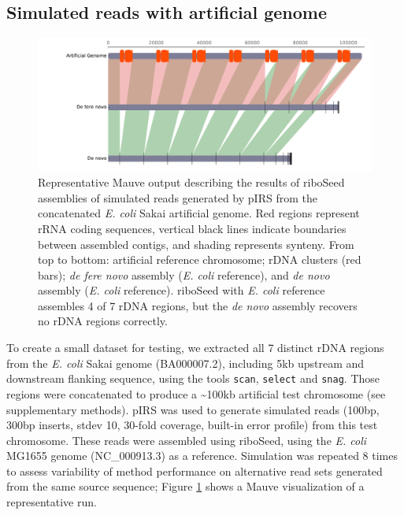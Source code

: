 \documentclass[a4,center,fleqn]{NAR}
\begin{document}
\subsection*{Simulated reads with artificial genome}


\begin{figure}[!b]
    \centering
    \hspace*{-.7cm}\includegraphics[width=1.2\columnwidth]{PrettyMauve}
    \caption{Representative Mauve output describing the results of riboSeed assemblies of simulated reads generated by pIRS from the concatenated \textit{E. coli} Sakai artificial genome. Red regions represent rRNA coding sequences, vertical black lines indicate boundaries between assembled contigs, and shading represents synteny. From top to bottom: artificial reference chromosome; rDNA clusters (red bars); \textit{de fere novo} assembly (\textit{E. coli} reference), and \textit{de novo} assembly (\textit{E. coli} reference). riboSeed with \textit{E. coli} reference assembles 4 of 7 rDNA regions, but the \textit{de novo} assembly recovers no rDNA regions correctly.
}
\label{fig:artificial}
\end{figure}


To create a small dataset for testing, we extracted all 7 distinct rDNA regions from the \textit{E. coli} Sakai genome (BA000007.2), including 5kb upstream and downstream flanking sequence, using the tools \texttt{scan}, \texttt{select} and \texttt{snag}. Those regions were concatenated to produce a \textasciitilde100kb artificial test chromosome (see supplementary methods). pIRS \cite{Hu2012} was used to generate simulated reads (100bp, 300bp inserts, stdev 10, 30-fold coverage, built-in error profile) from this test chromosome. These reads were assembled using riboSeed, using the \textit{E. coli} MG1655 genome (NC\_000913.3) as a reference.  Simulation was repeated 8 times to assess variability of method performance on alternative read sets generated from the same source sequence; Figure \ref{fig:artificial} shows a Mauve visualization of a representative run.
\end{document}
